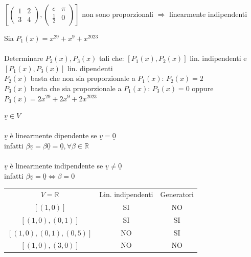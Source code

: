 \begin{es}
	$[
		\begin{pmatrix}
			1 & 2\\
			3 & 4
		\end{pmatrix},
		\begin{pmatrix}
			e           & \pi\\
			\frac{1}{2} & 0
		\end{pmatrix}
	]$ non sono proporzionali $\Longrightarrow$ linearmente indipendenti
\end{es}

\begin{esercizio}
	Sia $P_1(x)=x^{29}+x^9+x^2023$\\\\
	Determinare $P_2(x),P_3(x)$ tali che: $[P_1(x),P_2(x)]$ lin. indipendenti e $[P_1(x),P_3(x)]$ lin. dipendenti\\
	$P_2(x)$ basta che non sia proporzionale a $P_1(x)$: $P_2(x)=2$\\
	$P_3(x)$ basta che sia proporzionale a $P_1(x)$: $P_3(x)=0$ oppure $P_3(x)=2x^{29}+2x^9+2x^2023$
\end{esercizio}

\begin{osservazione}
	$\underline{v}\in V$\\\\
	$\underline{v}$ è linearmente dipendente se $\underline{v}=\underline{0}$\\
	infatti $\beta \underline{v}=\beta \underline{0}=\underline{0}, \forall\beta\in\mathbb{R}$\\\\
	$\underline{v}$ è linearmente indipendente se $\underline{v}\neq \underline{0}$\\
	infatti $\beta \underline{v}=\underline{0}\Longleftrightarrow \beta=0$
\end{osservazione}

\begin{center}
	\begin{tabular}{ccc}
		$V=\mathbb{R}$ & Lin. indipendenti & Generatori \\
			 $[(1,0)]$ &                SI & NO \\
	   $[(1,0),(0,1)]$ &                SI & SI \\
 $[(1,0),(0,1),(0,5)]$ &                NO & SI \\
	   $[(1,0),(3,0)]$ &                NO & NO \\
 \end{tabular}
\end{center}

